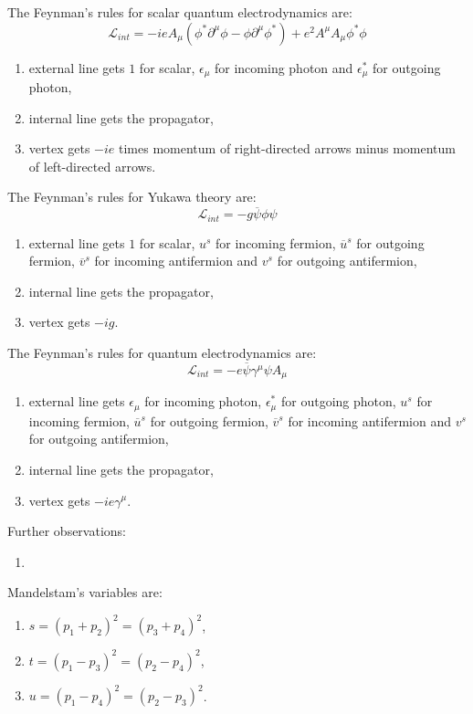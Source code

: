 \documentclass[a4paper]{article}
\begin{document}
    The Feynman's rules for scalar quantum electrodynamics are: \[ \mathcal L_{int} = - i e A_\mu (\phi^* \partial^\mu \phi - \phi \partial^\mu \phi^*) + e^2 A^\mu A_\mu \phi^* \phi\]
    \begin{enumerate}
        \item external line gets $1$ for scalar, $\epsilon_\mu$ for incoming photon and $\epsilon_\mu^*$ for outgoing photon,
        \item internal line gets the propagator,
        \item vertex gets $-ie$ times momentum of right-directed arrows minus momentum of left-directed arrows.
    \end{enumerate}

    The Feynman's rules for Yukawa theory are: \[ \mathcal  L_{int} = - g \overline \psi \phi \psi\]
    \begin{enumerate}
        \item external line gets $1$ for scalar, $u^s$ for incoming fermion, $\overline u^s$ for outgoing fermion, $\overline v^s$ for incoming antifermion and $v^s$ for outgoing antifermion,
        \item internal line gets the propagator,
        \item vertex gets $-ig$.
    \end{enumerate}

    The Feynman's rules for quantum electrodynamics are: \[ \mathcal L_{int} = - e \overline \psi \gamma^\mu \psi A_\mu \]
    \begin{enumerate} 
        \item external line gets $\epsilon_\mu$ for incoming photon, $\epsilon_\mu^*$ for outgoing photon, $u^s$ for incoming fermion, $\overline u^s$ for outgoing fermion, $\overline v^s$ for incoming antifermion and $v^s$ for outgoing antifermion,
        \item internal line gets the propagator,
        \item vertex gets $-ie\gamma^\mu$.
    \end{enumerate}

    Further observations:
    \begin{enumerate}
        \item 
    \end{enumerate}

    Mandelstam's variables are:
    \begin{enumerate}
        \item $s = (p_1 + p_2)^2 = (p_3 + p_4)^2$, 
        \item $t = (p_1 - p_3)^2 = (p_2 - p_4)^2$, 
        \item $u = (p_1 - p_4)^2 = (p_2 - p_3)^2$.
    \end{enumerate}





\nocite{qftlecture} 
\nocite{schwartz}  
\printbibliography

\immediate{}
\end{document}
